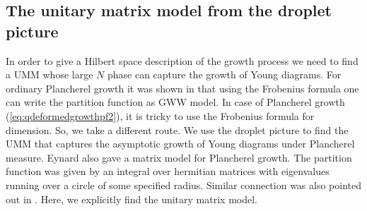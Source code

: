 \documentclass[3p,12pt]{elsarticle}
\numberwithin{equation}{section}
\begin{document}

\subsection{The unitary matrix model from the droplet picture}

\label{sec:umm-droplet}
In order to give a Hilbert space description of the \qd growth process we need to find a UMM whose large $N$ phase can capture the growth of Young diagrams. For ordinary Plancherel growth it was shown in \cite{Chattopadhyay:2019pkl} that using the Frobenius formula one can write the partition function as GWW model. In case of \qd Plancherel growth (\ref{eq:qdeformedgrowthpf2}), it is tricky to use the Frobenius formula for \qd dimension. So, we take a different route. We use the droplet picture \cite{duttagopakumar,Chattopadhyay} to find the UMM that captures the asymptotic growth of Young diagrams under \qd Plancherel measure. Eynard \cite{Eynard:2008mt} also gave a matrix model for \qd Plancherel growth. The partition function was given by an integral over hermitian matrices with eigenvalues running over a circle of some specified radius. Similar connection was also pointed out in \cite{1998math.10105B}. Here, we explicitly find the unitary matrix model.
\end{document}
